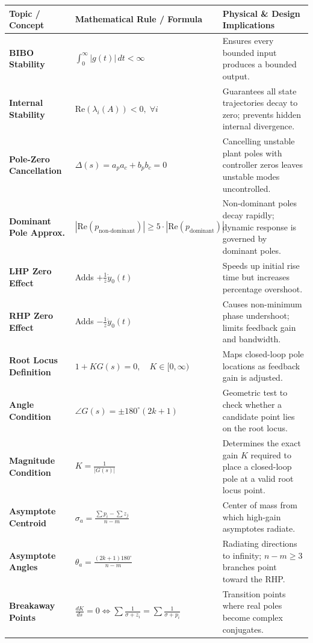 \documentclass[12pt,onecolumn,twoside ]{article}
\begin{document}
\begin{center}
	\small
	\begin{tabularx}{\textwidth}{L{0.8} L{0.6} L{1.4}}
		\toprule
		\textbf{Topic / Concept} & \textbf{Mathematical Rule / Formula} & \textbf{Physical \& Design Implications} \\
		\midrule
		\textbf{BIBO Stability} & $\int_0^\infty |g(t)| \, dt < \infty$ & Ensures every bounded input produces a bounded output. \\
		\textbf{Internal Stability} & $\text{Re}(\lambda_i(A)) < 0, \; \forall i$ & Guarantees all state trajectories decay to zero; prevents hidden internal divergence. \\
		\textbf{Pole-Zero Cancellation} & $\Delta(s) = a_p a_c + b_p b_c = 0$ & Cancelling unstable plant poles with controller zeros leaves unstable modes uncontrolled. \\
		\textbf{Dominant Pole Approx.} & $|\text{Re}(p_{\text{non-dominant}})| \ge 5 \cdot |\text{Re}(p_{\text{dominant}})|$ & Non-dominant poles decay rapidly; dynamic response is governed by dominant poles. \\
		\textbf{LHP Zero Effect} & Adds $+ \frac{1}{z}\dot{y}_0(t)$ & Speeds up initial rise time but increases percentage overshoot. \\
		\textbf{RHP Zero Effect} & Adds $- \frac{1}{z}\dot{y}_0(t)$ & Causes non-minimum phase undershoot; limits feedback gain and bandwidth. \\
		\textbf{Root Locus Definition} & $1 + K G(s) = 0, \quad K \in [0, \infty)$ & Maps closed-loop pole locations as feedback gain is adjusted. \\
		\textbf{Angle Condition} & $\angle G(s) = \pm 180^\circ(2k+1)$ & Geometric test to check whether a candidate point lies on the root locus. \\
		\textbf{Magnitude Condition} & $K = \frac{1}{|G(s)|}$ & Determines the exact gain $K$ required to place a closed-loop pole at a valid root locus point. \\
		\textbf{Asymptote Centroid} & $\sigma_a = \frac{\sum p_i - \sum z_j}{n - m}$ & Center of mass from which high-gain asymptotes radiate. \\
		\textbf{Asymptote Angles} & $\theta_a = \frac{(2k+1)180^\circ}{n - m}$ & Radiating directions to infinity; $n - m \ge 3$ branches point toward the RHP. \\
		\textbf{Breakaway Points} & $\frac{dK}{ds} = 0 \iff \sum \frac{1}{\sigma+z_i} = \sum \frac{1}{\sigma+p_i}$ & Transition points where real poles become complex conjugates. \\
		\bottomrule
	\end{tabularx}
\end{center}
	
\end{document}
